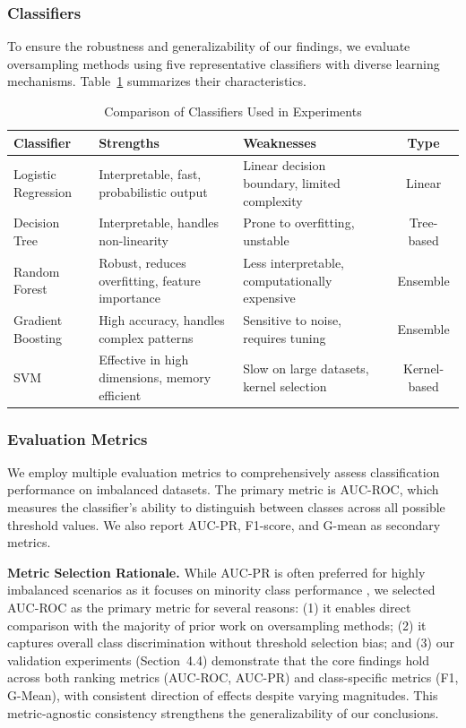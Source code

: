 \documentclass[12pt,a4paper]{article}
\theoremstyle{definition}
\begin{document}
\subsubsection{Classifiers}
To ensure the robustness and generalizability of our findings, we evaluate oversampling methods using five representative classifiers with diverse learning mechanisms. Table~\ref{tab:classifiers} summarizes their characteristics.

\begin{table}[!ht]
 \centering
 \caption{Comparison of Classifiers Used in Experiments}
 \label{tab:classifiers}
 \begin{tabular}{lp{3.5cm}p{3.5cm}c}
 \toprule
 \textbf{Classifier} & \textbf{Strengths} & \textbf{Weaknesses} & \textbf{Type} \\
 \midrule
 Logistic Regression & Interpretable, fast, probabilistic output & Linear decision boundary, limited complexity & Linear \\
 Decision Tree & Interpretable, handles non-linearity & Prone to overfitting, unstable & Tree-based \\
 Random Forest & Robust, reduces overfitting, feature importance & Less interpretable, computationally expensive & Ensemble \\
 Gradient Boosting & High accuracy, handles complex patterns & Sensitive to noise, requires tuning & Ensemble \\
 SVM & Effective in high dimensions, memory efficient & Slow on large datasets, kernel selection & Kernel-based \\
 \bottomrule
 \end{tabular}
\end{table}

\subsubsection{Evaluation Metrics}
We employ multiple evaluation metrics to comprehensively assess classification performance on imbalanced datasets. The primary metric is AUC-ROC, which measures the classifier's ability to distinguish between classes across all possible threshold values. We also report AUC-PR, F1-score, and G-mean as secondary metrics.

\textbf{Metric Selection Rationale.} While AUC-PR is often preferred for highly imbalanced scenarios as it focuses on minority class performance 
\cite{pr2019bayesian}, we selected AUC-ROC as the primary metric for several reasons: 
(1) it enables direct comparison with the majority of prior work on oversampling methods; 
(2) it captures overall class discrimination without threshold selection bias; and 
(3) our validation experiments (Section~4.4) demonstrate that the core findings hold across both ranking metrics (AUC-ROC, AUC-PR) and class-specific metrics (F1, G-Mean), with consistent direction of effects despite varying magnitudes. 
This metric-agnostic consistency strengthens the generalizability of our conclusions.
\end{document}
